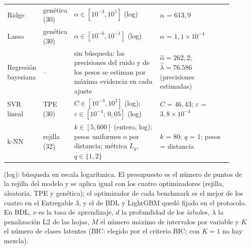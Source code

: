 \begin{table}[tbp]
\begin{tabular}{>{\raggedright\arraybackslash}p{0.13\linewidth} >{\raggedright\arraybackslash}p{0.09\linewidth} >{\raggedright\arraybackslash}p{0.38\linewidth} >{\raggedright\arraybackslash}p{0.32\linewidth}}
    Ridge & genética (30) & $\alpha \in [10^{-3}, 10^{5}]$ (log) & $\alpha$ = $613{,}9$ \\
    Lasso & genética (30) & $\alpha \in [10^{-6}, 10^{-1}]$ (log) & $\alpha$ = $1{,}1 \times 10^{-4}$ \\
    Regresión bayesiana & -- & sin búsqueda: las precisiones del ruido y de los pesos se estiman por máxima evidencia en cada ajuste & $\hat\alpha = 262{,}2$; $\hat\lambda = 76.586$ (precisiones estimadas) \\
    SVR lineal & TPE (30) & $C \in [10^{-3}, 10^{2}]$ (log); $\varepsilon \in [10^{-4};\,0{,}05]$ (log) & $C$ = $46{,}43$; $\varepsilon$ = $3{,}8 \times 10^{-4}$ \\
    k-NN & rejilla (32) & $k \in [5, 600]$ (entero, log); pesos uniformes o por distancia; métrica $L_q$, $q \in \{1, 2\}$ & $k$ = 80; $q$ = 1; pesos = distancia \\
    \bottomrule
  \end{tabular}
  \par\smallskip\begin{minipage}{0.97\linewidth}\scriptsize (log): búsqueda en escala logarítmica. El presupuesto es el número de puntos de la rejilla del modelo y se aplica igual con los cuatro optimizadores (rejilla, aleatoria, TPE y genética); el optimizador de cada benchmark es el mejor de los cuatro en el Entregable 3, y el de BDL y LightGBM quedó fijado en el protocolo. En BDL, $\nu$ es la tasa de aprendizaje, $d$ la profundidad de los árboles, $\lambda$ la penalización L2 de las hojas, $M$ el número máximo de intervalos por variable y $K$ el número de clases latentes (BIC: elegido por el criterio BIC; con $K=1$ no hay mezcla).\end{minipage}
\end{table}
